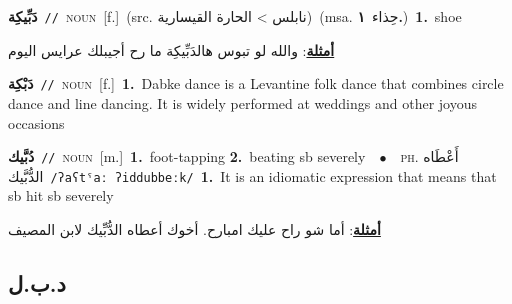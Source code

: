 \documentclass[10pt,a4paper,twoside]{article} %
\begin{document}
\begin{multicols}{2}
{\setlength\topsep{0pt}\textbf{\foreignlanguage{arabic}{دَبِّيكِة}}\ {\color{gray}\texttt{//}\color{black}}\ \textsc{noun}\ [f.]\ (src. \color{gray}\foreignlanguage{arabic}{نابلس > الحارة القيسارية}\color{black})\ \color{gray}(msa. \foreignlanguage{arabic}{حِذاء}~\foreignlanguage{arabic}{\textbf{١.}})\color{black}\ \textbf{1.}~shoe\  \begin{flushright}\color{gray}\foreignlanguage{arabic}{\textbf{\underline{\foreignlanguage{arabic}{أمثلة}}}: والله لو تبوس هالدَبِّيكِة ما رح أجيبلك عرايس اليوم}\end{flushright}\color{black}} \vspace{2mm}

{\setlength\topsep{0pt}\textbf{\foreignlanguage{arabic}{دَبْكِة}}\ {\color{gray}\texttt{//}\color{black}}\ \textsc{noun}\ [f.]\ \textbf{1.}~Dabke dance is a Levantine folk dance that combines circle dance and line dancing. It is widely performed at weddings and other joyous occasions\ } \vspace{2mm}

{\setlength\topsep{0pt}\textbf{\foreignlanguage{arabic}{دُبَّيك}}\ {\color{gray}\texttt{//}\color{black}}\ \textsc{noun}\ [m.]\ \textbf{1.}~foot-tapping  \textbf{2.}~beating sb severely\ \ $\bullet$\ \ \textsc{ph.} \color{gray} \foreignlanguage{arabic}{أَعْطَاه الدُّبَّيك}\color{black}\ {\color{gray}\texttt{/{\sffamily ʔaʕtˤaː ʔiddubbeːk}/}\color{black}}\ \textbf{1.}~It is an idiomatic expression that means that sb hit sb severely\  \begin{flushright}\color{gray}\foreignlanguage{arabic}{\textbf{\underline{\foreignlanguage{arabic}{أمثلة}}}: أما شو راح عليك امبارح. أخوك أعطاه الدُّبِّيك لابن المصيف}\end{flushright}\color{black}} \vspace{2mm}

\vspace{-3mm}
\subsection*{\color{blue}\foreignlanguage{arabic}{د.ب.ل}\color{blue}{}} 


\end{multicols}
\end{document}
